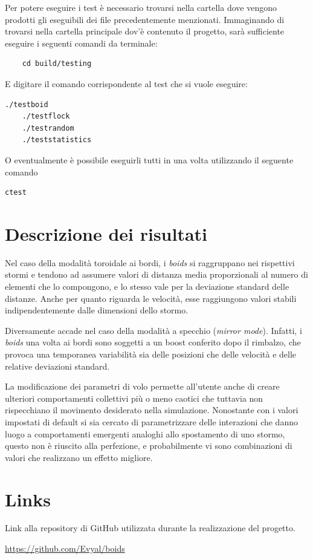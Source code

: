 \documentclass[10pt,a4paper]{article}
\begin{document}
Per potere eseguire i test è necessario trovarsi nella cartella dove vengono prodotti gli eseguibili dei file precedentemente menzionati. Immaginando di trovarsi nella cartella principale dov'è contenuto il progetto, sarà sufficiente eseguire i seguenti comandi da terminale:

\begin{lstlisting}
    cd build/testing
\end{lstlisting}

E digitare il comando corrispondente al test che si vuole eseguire: 

\begin{lstlisting}[style=codecolour, language=bash]
    ./testboid
    ./testflock
    ./testrandom
    ./teststatistics
\end{lstlisting}

O eventualmente è possibile eseguirli tutti in una volta utilizzando il seguente comando

\begin{lstlisting}[style=codecolour, language=bash]
    ctest
\end{lstlisting}


\section{Descrizione dei risultati}

 Nel caso della modalità toroidale ai bordi, i \textit{boids} si raggruppano nei rispettivi stormi e tendono ad assumere valori di distanza media proporzionali al numero di elementi che lo compongono, e lo stesso vale per la deviazione standard delle distanze. Anche per quanto riguarda le velocità, esse raggiungono valori stabili indipendentemente dalle dimensioni dello stormo.

Diversamente accade nel caso della modalità a specchio (\textit{mirror mode}). Infatti, i \textit{boids} una volta ai bordi sono soggetti a un boost conferito dopo il rimbalzo, che provoca una temporanea variabilità sia delle posizioni che delle velocità e delle relative deviazioni standard.

La modificazione dei parametri di volo permette all'utente anche di creare ulteriori comportamenti collettivi più o meno caotici che tuttavia non rispecchiano il movimento desiderato nella simulazione. Nonostante con i valori impostati di default si sia cercato di parametrizzare delle interazioni che danno luogo a comportamenti emergenti analoghi allo spostamento di uno stormo, questo non è riuscito alla perfezione, e probabilmente vi sono combinazioni di valori che realizzano un effetto migliore. 

\section{Links}

\setlength{\parindent}{20pt}
Link alla repository di GitHub utilizzata durante la realizzazione del progetto.

\url{https://github.com/Evyal/boids}
\end{document}
